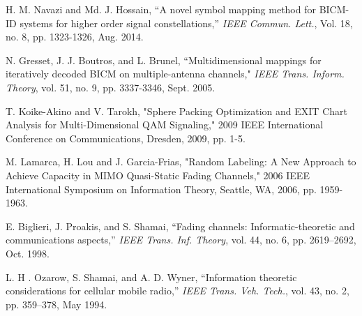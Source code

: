 \documentclass[12pt, draftclsnofoot, onecolumn]{IEEEtran}
\begin{document}
\begin{thebibliography}{bl}
 H. M. Navazi and Md. J. Hossain, \newblock ``A novel symbol mapping method for BICM-ID systems for higher order signal constellations,'' \newblock \emph{IEEE Commun. Lett.}, Vol. 18, no. 8, pp. 1323-1326, Aug. 2014. 

 N. Gresset, J. J. Boutros, and L. Brunel, \newblock ``Multidimensional mappings for iteratively decoded BICM on multiple-antenna channels," \newblock \emph {IEEE Trans. Inform. Theory}, vol. 51, no. 9, pp. 3337-3346, Sept. 2005.

T. Koike-Akino and V. Tarokh, "Sphere Packing Optimization and EXIT Chart Analysis for Multi-Dimensional QAM Signaling," 2009 IEEE International Conference on Communications, Dresden, 2009, pp. 1-5.

 M. Lamarca, H. Lou and J. Garcia-Frias, "Random Labeling: A New Approach to Achieve Capacity in MIMO Quasi-Static Fading Channels," 2006 IEEE International Symposium on Information Theory, Seattle, WA, 2006, pp. 1959-1963.






 E. Biglieri, J. Proakis, and S. Shamai, ``Fading channels: Informatic-theoretic and communications aspects,'' \newblock \emph{IEEE Trans. Inf. Theory}, vol. 44, no. 6, pp. 2619–2692, Oct. 1998.

 L. H
. Ozarow, S. Shamai, and A. D. Wyner, ``Information theoretic considerations for cellular mobile radio,'' \newblock \emph {IEEE Trans. Veh. Tech.}, vol. 43, no. 2, pp. 359–378, May 1994.



\end{thebibliography}
\end{document}
